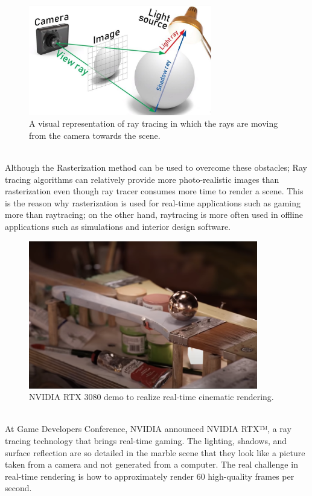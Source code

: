 \documentclass[11pt,a4paper]{article}
\begin{document}
\begin{figure}[h]	
     \centering
     \captionsetup{justification=centering,margin=2cm}
     \includegraphics[width=8cm]{images/raytracer_2.jpg}
     \caption{A visual representation of ray tracing in which the rays are moving from the camera towards the scene. \protect\cite{Kimathi2020}}
     \label{fig:raytracer}
\end{figure}

\noindent
\\
Although the Rasterization method can be used to overcome these obstacles; Ray tracing algorithms can relatively provide more photo-realistic images than rasterization even though ray tracer consumes more time to render a scene. This is the reason why rasterization is used for real-time applications such as gaming more than raytracing; on the other hand, raytracing is more often used in offline applications such as simulations and interior design software.
\clearpage

\begin{figure}[h]	
     \centering
     \captionsetup{justification=centering,margin=2cm}
     \includegraphics[width=10cm]{images/marbel_brush.png}
     \caption{NVIDIA RTX 3080 demo to realize real-time cinematic rendering.
\protect\cite{Burke2018}}
     \label{fig:rtxdemo}
\end{figure}

\noindent
\\
At Game Developers Conference, NVIDIA announced NVIDIA RTX™, a ray tracing technology that brings real-time gaming. The lighting, shadows, and surface reflection are so detailed in the marble scene that they look like a picture taken from a camera and not generated from a computer. The real challenge in real-time rendering is how to approximately render 60 high-quality frames per second.
\end{document}

